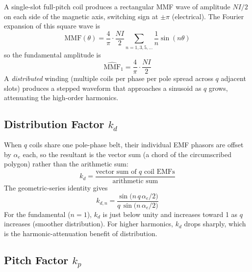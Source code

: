 \documentclass[12pt,a4paper]{article}
\begin{document}
A single-slot full-pitch coil produces a rectangular MMF wave of
amplitude $NI/2$ on each side of the magnetic axis, switching sign at
$\pm\pi$ (electrical).
The Fourier expansion of this square wave is
\begin{equation}
  \mathrm{MMF}(\theta) = \frac{4}{\pi}\cdot\frac{NI}{2}
  \sum_{n=1,3,5,\ldots}\frac{1}{n}\sin(n\theta)
\end{equation}
so the fundamental amplitude is
\begin{equation}
  \widehat{\mathrm{MMF}}_1 = \frac{4}{\pi}\cdot\frac{NI}{2}
\end{equation}
A \emph{distributed} winding (multiple coils per phase per pole spread
across $q$ adjacent slots) produces a stepped waveform that approaches
a sinusoid as $q$ grows, attenuating the high-order harmonics.

\subsection{Distribution Factor $k_d$}

When $q$ coils share one pole-phase belt, their individual EMF
phasors are offset by $\alpha_e$ each, so the resultant is the vector
sum (a chord of the circumscribed polygon) rather than the arithmetic
sum:
\begin{equation}
  k_d = \frac{\text{vector sum of }q\text{ coil EMFs}}
             {\text{arithmetic sum}}
\end{equation}
The geometric-series identity gives
\begin{equation}
  k_{d,n} = \frac{\sin\!\bigl(n\,q\,\alpha_e/2\bigr)}
                 {q\,\sin\!\bigl(n\,\alpha_e/2\bigr)}
  \label{eq:kd}
\end{equation}
For the fundamental ($n=1$), $k_d$ is just below unity and increases
toward 1 as $q$ increases (smoother distribution). For higher
harmonics, $k_d$ drops sharply, which is the harmonic-attenuation
benefit of distribution.

\subsection{Pitch Factor $k_p$}
\end{document}
